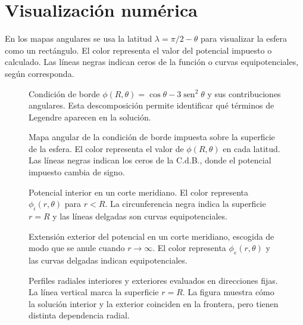\documentclass[11pt]{article}
\newcommand{\sen}{\operatorname{sen}}
\begin{document}
\section*{Visualización numérica}

En los mapas angulares se usa la latitud $\lambda=\pi/2-\theta$ para visualizar la esfera como un rectángulo. El color representa el valor del potencial impuesto o calculado. Las líneas negras indican ceros de la función o curvas equipotenciales, según corresponda.

\begin{figure}[h]
\centering

\caption{Condición de borde $\phi(R,\theta)=\cos\theta-3\sen^2\theta$ y sus contribuciones angulares. Esta descomposición permite identificar qué términos de Legendre aparecen en la solución.}
\end{figure}

\begin{figure}[h]
\centering

\caption{Mapa angular de la condición de borde impuesta sobre la superficie de la esfera. El color representa el valor de $\phi(R,\theta)$ en cada latitud. Las líneas negras indican los ceros de la C.d.B., donde el potencial impuesto cambia de signo.}
\end{figure}

\begin{figure}[h]
\centering

\caption{Potencial interior en un corte meridiano. El color representa $\phi_i(r,\theta)$ para $r<R$. La circunferencia negra indica la superficie $r=R$ y las líneas delgadas son curvas equipotenciales.}
\end{figure}

\begin{figure}[h]
\centering

\caption{Extensión exterior del potencial en un corte meridiano, escogida de modo que se anule cuando $r\to\infty$. El color representa $\phi_e(r,\theta)$ y las curvas delgadas indican equipotenciales.}
\end{figure}

\begin{figure}[h]
\centering

\caption{Perfiles radiales interiores y exteriores evaluados en direcciones fijas. La línea vertical marca la superficie $r=R$. La figura muestra cómo la solución interior y la exterior coinciden en la frontera, pero tienen distinta dependencia radial.}
\end{figure}
\end{document}
